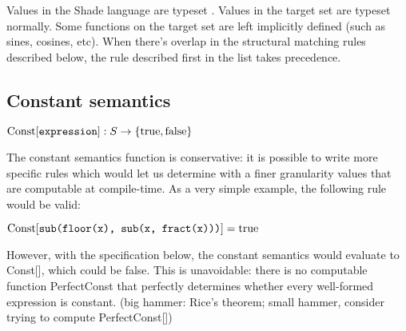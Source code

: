 \documentclass{article}
\begin{document}
Values in the Shade language are typeset . Values in the
target set are typeset normally. Some functions on the target set are
left implicitly defined (such as sines, cosines, etc).  When there's
overlap in the structural matching rules described below, the rule
described first in the list takes precedence.

\subsection{Constant semantics}

$\textrm{Const}[\texttt{expression}]: S \to \{\textrm{true}, \textrm{false}\}$

The constant semantics function is conservative: it is possible to
write more specific rules which would let us determine with a finer
granularity values that are computable at compile-time. As a very
simple example, the following rule would be valid:

$\textrm{Const}[\texttt{sub(floor(x), sub(x, fract(x)))}] = \textrm{true}$

However, with the specification below, the constant semantics would
evaluate  to Const[], which could
be false. This is unavoidable: there is no computable function
PerfectConst that perfectly determines whether every well-formed
expression is constant. (big hammer: Rice's theorem; small hammer,
consider trying to compute PerfectConst[])
\end{document}

